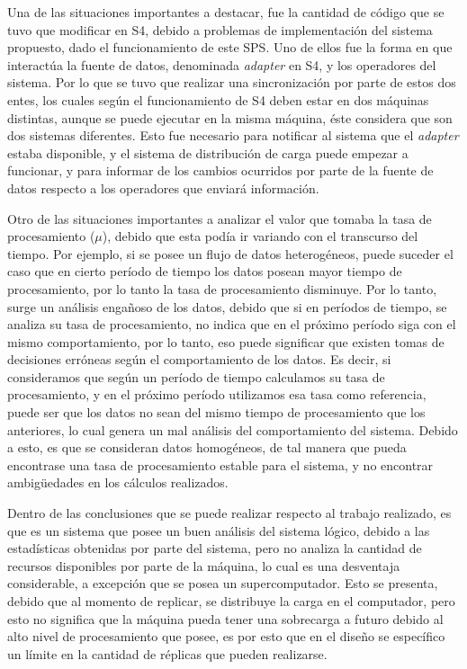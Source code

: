 Una de las situaciones importantes a destacar, fue la cantidad de código que se tuvo que modificar en S4, debido a problemas de implementación del sistema propuesto, dado el funcionamiento de este SPS. Uno de ellos fue la forma en que interactúa la fuente de datos, denominada \textit{adapter} en S4, y los operadores del sistema. Por lo que se tuvo que realizar una sincronización por parte de estos dos entes, los cuales según el funcionamiento de S4 deben estar en dos máquinas distintas, aunque se puede ejecutar en la misma máquina, éste considera que son dos sistemas diferentes. Esto fue necesario para notificar al sistema que el \textit{adapter} estaba disponible, y el sistema de distribución de carga puede empezar a funcionar, y para informar de los cambios ocurridos por parte de la fuente de datos respecto a los operadores que enviará información.

Otro de las situaciones importantes a analizar el valor que tomaba la tasa de procesamiento ($\mu$), debido que esta podía ir variando con el transcurso del tiempo. Por ejemplo, si se posee un flujo de datos heterogéneos, puede suceder el caso que en cierto período de tiempo los datos posean mayor tiempo de procesamiento, por lo tanto la tasa de procesamiento disminuye. Por lo tanto, surge un análisis engañoso de los datos, debido que si en períodos de tiempo, se analiza su tasa de procesamiento, no indica que en el próximo período siga con el mismo comportamiento, por lo tanto, eso puede significar que existen tomas de decisiones erróneas según el comportamiento de los datos. Es decir, si consideramos que según un período de tiempo calculamos su tasa de procesamiento, y en el próximo período utilizamos esa tasa como referencia, puede ser que los datos no sean del mismo tiempo de procesamiento que los anteriores, lo cual genera un mal análisis del comportamiento del sistema. Debido a esto, es que se consideran datos homogéneos, de tal manera que pueda encontrase una tasa de procesamiento estable para el sistema, y no encontrar ambigüedades en los cálculos realizados.

Dentro de las conclusiones que se puede realizar respecto al trabajo realizado, es que es un sistema que posee un buen análisis del sistema lógico, debido a las estadísticas obtenidas por parte del sistema, pero no analiza la cantidad de recursos disponibles por parte de la máquina, lo cual es una desventaja considerable, a excepción que se posea un supercomputador. Esto se presenta, debido que al momento de replicar, se distribuye la carga en el computador, pero esto no significa que la máquina pueda tener una sobrecarga a futuro debido al alto nivel de procesamiento que posee, es por esto que en el diseño se específico un límite en la cantidad de réplicas que pueden realizarse.

